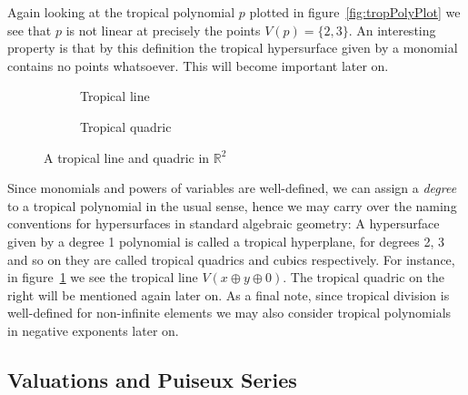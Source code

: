 \documentclass[
  paper=a4,
  titlepage,
  bibliography=totoc,
  listof=totoc,
  pagesize=pdftex
]{scrartcl}
\numberwithin{figure}{section}
\numberwithin{equation}{section}
\numberwithin{table}{section}
\newcommand*\setR{\mathds{R}}
\theoremstyle{definition}
\numberwithin{definition}{section}
\begin{document}
Again looking at the tropical polynomial $p$ plotted in figure~\ref{fig:tropPolyPlot} we
see that $p$ is not linear at precisely the points $V(p) = \{ 2, 3 \}$. An interesting
property is that by this definition the tropical hypersurface given by a monomial contains
no points whatsoever. This will become important later on.

\begin{figure}[tbh]
  \centering
  \begin{subfigure}{0.49\textwidth}
    \centering
    \caption{Tropical line}
    \label{fig:trop:line}
  \end{subfigure}
  \begin{subfigure}{0.49\textwidth}
    \centering
    \caption{Tropical quadric}
    \label{fig:trop:quad}
  \end{subfigure}
  \caption{A tropical line and quadric in $\setR^2$}
  \label{fig:tropLineQuad}
\end{figure}

Since monomials and powers of variables are well-defined, we can assign a \emph{degree} to
a tropical polynomial in the usual sense, hence we may carry over the naming conventions
for hypersurfaces in standard algebraic geometry: A hypersurface given by a degree 1
polynomial is called a tropical hyperplane, for degrees 2, 3 and so on they are called
tropical quadrics and cubics respectively. For instance, in
figure~\ref{fig:trop:line} we see the tropical line $V(x \oplus y
\oplus 0)$. The tropical quadric on the right will be mentioned again later on. As a final
note, since tropical division is well-defined for non-infinite elements we may also
consider tropical polynomials in negative exponents later on.

\subsection{Valuations and Puiseux Series}
\end{document}
